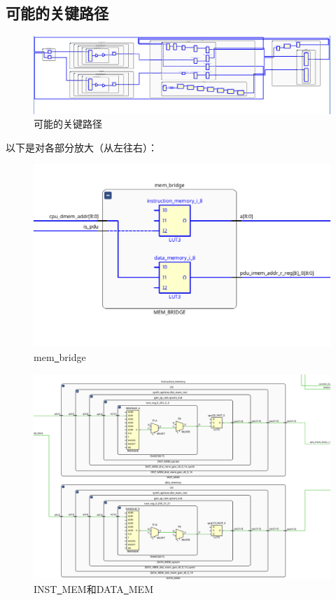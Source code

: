 \documentclass[12pt,a4paper]{ctexart}
\begin{document}
\subsection{可能的关键路径}
\begin{figure}[H]
    \centering
    \includegraphics[scale=0.35]{pic/key.png}
    \caption{可能的关键路径}
\end{figure}
以下是对各部分放大（从左往右）：
\begin{figure}[H]
    \centering
    \includegraphics[scale=0.5]{pic/10.png}
    \caption{mem\underline{~}bridge}
\end{figure}
\begin{figure}[H]
    \centering
    \includegraphics[scale=0.5]{pic/11.png}
    \caption{INST\underline{~}MEM和DATA\underline{~}MEM}
\end{figure}
\end{document}
